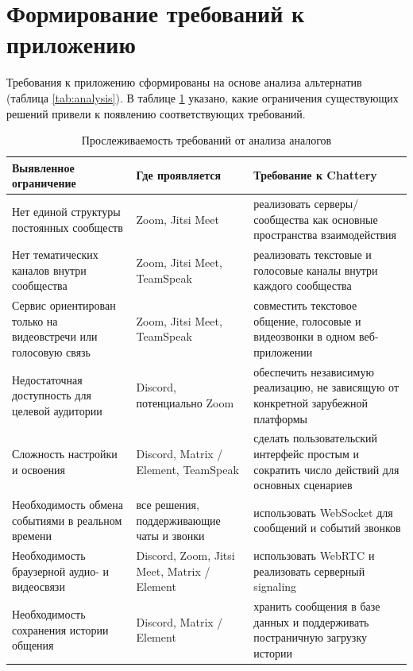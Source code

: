\documentclass[a4paper,12pt]{extarticle}
\begin{document}
\newpage

\section{Формирование требований к приложению}

Требования к приложению сформированы на основе анализа альтернатив (таблица \ref{tab:analysis}). В таблице \ref{tab:req_trace} указано, какие ограничения существующих решений привели к появлению соответствующих требований.

\begin{table}[htbp]
\centering
\small
\renewcommand{\arraystretch}{1.2}
\footnotesize
\begin{tabular}{|p{5cm}|p{5cm}|p{6cm}|}
\hline
\textbf{Выявленное ограничение} & \textbf{Где проявляется} & \textbf{Требование к Chattery} \\
\hline
Нет единой структуры постоянных сообществ & Zoom, Jitsi Meet & реализовать серверы/сообщества как основные пространства взаимодействия \\
\hline
Нет тематических каналов внутри сообщества & Zoom, Jitsi Meet, TeamSpeak & реализовать текстовые и голосовые каналы внутри каждого сообщества \\
\hline
Сервис ориентирован только на видеовстречи или голосовую связь & Zoom, Jitsi Meet, TeamSpeak & совместить текстовое общение, голосовые и видеозвонки в одном веб-приложении \\
\hline
Недостаточная доступность для целевой аудитории & Discord, потенциально Zoom & обеспечить независимую реализацию, не зависящую от конкретной зарубежной платформы \\
\hline
Сложность настройки и освоения & Discord, Matrix / Element, TeamSpeak & сделать пользовательский интерфейс простым и сократить число действий для основных сценариев \\
\hline
Необходимость обмена событиями в реальном времени & все решения, поддерживающие чаты и звонки & использовать WebSocket для сообщений и событий звонков \\
\hline
Необходимость браузерной аудио- и видеосвязи & Discord, Zoom, Jitsi Meet, Matrix / Element & использовать WebRTC и реализовать серверный signaling \\
\hline
Необходимость сохранения истории общения & Discord, Matrix / Element & хранить сообщения в базе данных и поддерживать постраничную загрузку истории \\
\hline
\end{tabular}
\caption{Прослеживаемость требований от анализа аналогов}
\label{tab:req_trace}
\end{table}
\end{document}
